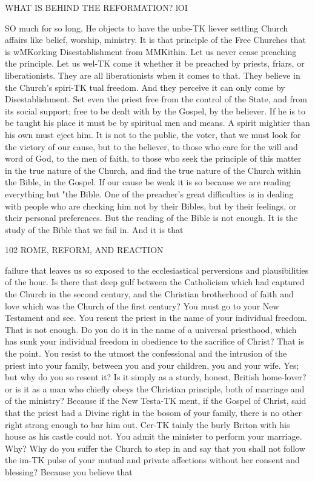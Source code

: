 \documentclass[12pt,a5paper,oneside]{book}
\begin{document}
WHAT IS BEHIND THE REFORMATION? lOI 

SO much for so long. He objects to have the unbe-TK
liever settling Church affairs like belief, worship, 
ministry. It is that principle of the Free Churches 
that is wMKorking Disestablishment from MMKithin. Let 
us never cease preaching the principle. Let us wel-TK
come it whether it be preached by priests, friars, or 
liberationists. They are all liberationists when it 
comes to that. They believe in the Church's spiri-TK
tual freedom. And they perceive it can only come 
by Disestablishment. Set even the priest free from 
the control of the State, and from its social support; 
free to be dealt with by the Gospel, by the believer. 
If he is to be taught his place it must be by 
spiritual men and means. A spirit mightier than his 
own must eject him. It is not to the public, the 
voter, that we must look for the victory of our cause, 
but to the believer, to those who care for the will and 
word of God, to the men of faith, to those who seek 
the principle of this matter in the true nature of the 
Church, and find the true nature of the Church within 
the Bible, in the Gospel. If our cause be weak it is 
so because we are reading everything but "the Bible. 
One of the preacher's great difficulties is in dealing with 
people who are checking him not by their Bibles, but 
by their feelings, or their personal preferences. But 
the reading of the Bible is not enough. It is the 
study of the Bible that we fail in. And it is that 



102 ROME, REFORM, AND REACTION 

failure that leaves us so exposed to the ecclesiastical 
perversions and plausibilities of the hour. Is there 
that deep gulf between the Catholicism which had 
captured the Church in the second century, and the 
Christian brotherhood of faith and love which was 
the Church of the first century? You must go to your 
New Testament and see. You resent the priest in 
the name of your individual freedom. That is not 
enough. Do you do it in the name of a universal 
priesthood, which has sunk your individual freedom in 
obedience to the sacrifice of Christ? That is the 
point. You resist to the utmost the confessional and 
the intrusion of the priest into your family, between 
you and your children, you and your wife. Yes; but 
why do you so resent it? Is it simply as a sturdy, 
honest, British home-lover? or is it as a man who 
chiefly obeys the Christian principle, both of marriage 
and of the ministry? Because if the New Testa-TK
ment, if the Gospel of Christ, said that the priest had 
a Divine right in the bosom of your family, there is 
no other right strong enough to bar him out. Cer-TK
tainly the burly Briton with his house as his castle 
could not. You admit the minister to perform your 
marriage. Why? Why do you suffer the Church 
to step in and say that you shall not follow the im-TK
pulse of your mutual and private affections without 
her consent and blessing? Because you believe that 
\end{document}

